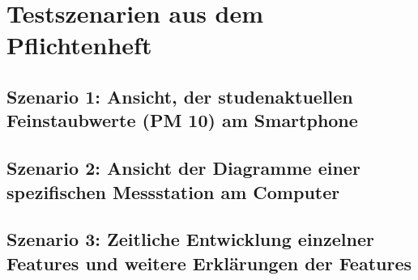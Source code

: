 \section{Testszenarien aus dem Pflichtenheft}
\subsection*{Szenario 1: Ansicht, der studenaktuellen Feinstaubwerte (PM 10) am Smartphone}
\subsection*{Szenario 2: Ansicht der Diagramme einer spezifischen Messstation am Computer}
\subsection*{Szenario 3: Zeitliche Entwicklung einzelner \glspl{Feature} und weitere Erklärungen der \glspl{Feature}}